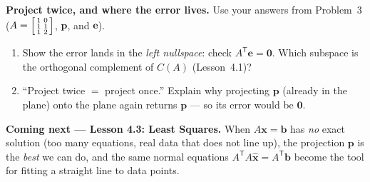 \documentclass[10pt]{article}
\newcommand{\xx}{\mathbf{x}}
\newcommand{\bb}{\mathbf{b}}
\newcommand{\pp}{\mathbf{p}}
\newcommand{\ee}{\mathbf{e}}
\newcommand{\zero}{\mathbf{0}}
\newcommand{\T}{\mathsf{T}}
\begin{document}
\begin{extensionbox}
\textbf{Project twice, and where the error lives.} Use your answers from Problem~3
($A=\begin{bsmallmatrix} 1&0\\1&1\\1&2 \end{bsmallmatrix}$, $\pp$, and $\ee$).
\begin{enumerate}[label=(\alph*), leftmargin=1.8em, itemsep=5pt]
  \item Show the error lands in the \emph{left nullspace}: check $A^{\T}\ee=\zero$. Which subspace is the
        orthogonal complement of $C(A)$ (Lesson~4.1)?
  \item ``Project twice $=$ project once.'' Explain why projecting $\pp$ (already in the plane) onto the
        plane again returns $\pp$ --- so its error would be $\zero$.
\end{enumerate}
\end{extensionbox}

\begin{spiralbox}
\textbf{Coming next --- Lesson 4.3: Least Squares.} When $A\xx=\bb$ has \emph{no} exact solution
(too many equations, real data that does not line up), the projection $\pp$ is the \emph{best} we can do,
and the same normal equations $A^{\T}A\hat{\xx}=A^{\T}\bb$ become the tool for fitting a straight line to
data points.
\end{spiralbox}
\end{document}
